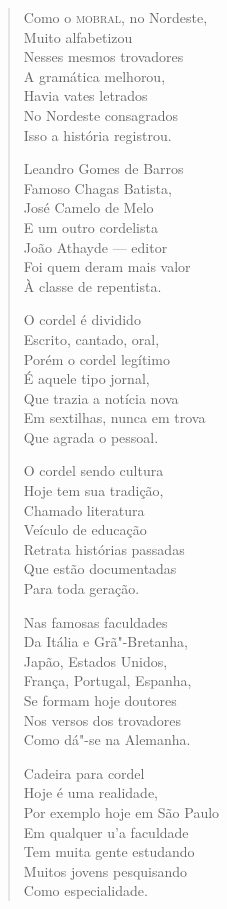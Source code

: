 \begin{verse}
Como o \textsc{mobral}, no Nordeste, \\
Muito alfabetizou \\
Nesses mesmos trovadores \\
A gramática melhorou, \\
Havia vates letrados \\
No Nordeste consagrados \\
Isso a história registrou. 


Leandro Gomes de Barros \\
Famoso Chagas Batista, \\
José Camelo de Melo \\
E um outro cordelista \\
João Athayde ---  editor \\
Foi quem deram mais valor \\
À classe de repentista. 

O cordel é dividido \\
Escrito, cantado, oral, \\
Porém o cordel legítimo \\
É aquele tipo jornal, \\
Que trazia a notícia nova \\
Em sextilhas, nunca em trova \\
Que agrada o pessoal. 

O cordel sendo cultura \\
Hoje tem sua tradição, \\
Chamado literatura \\
Veículo de educação \\
Retrata histórias passadas \\
Que estão documentadas \\
Para toda geração. 

Nas famosas faculdades \\
Da Itália e Grã"-Bretanha, \\
Japão, Estados Unidos, \\
França, Portugal, Espanha, \\
Se formam hoje doutores \\
Nos versos dos trovadores \\
Como dá"-se na Alemanha. 


Cadeira para cordel \\
Hoje é uma realidade, \\
Por exemplo hoje em São Paulo \\
Em qualquer u'a faculdade \\
Tem muita gente estudando \\
Muitos jovens pesquisando \\
Como especialidade. 


\end{verse}
